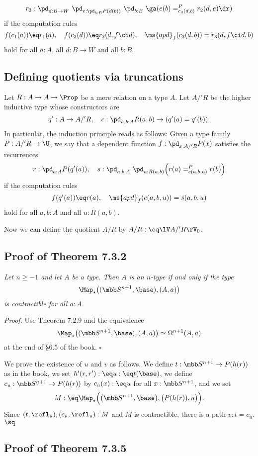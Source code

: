 \documentclass[12pt]{article}
\begin{document}
$$
r_3:\pd_{d:B\to W}\ \pd_{e:\pd_{b:B}P(d(b))}\ \pd_{b:B}\ \ga(e(b)=^P_{c_3(d,b)}r_2(d,e)\dr)
$$ 
if the computation rules
$$
f(c_1(a))\eq r_1(a),\quad f(c_2(d))\eq r_2(d,f\ci d),\quad\ms{apd}_f(c_3(d,b))=r_3(d,f\ci d,b)
$$ 
hold for all $a:A$, all $d:B\to W$ and all $b:B$. 


\subsection{Defining quotients via truncations}\label{qvt}

Let $R:A\to A\to\Prop$ be a mere relation on a type $A$. Let $A/'R$ be the higher inductive type whose constructors are 
$$
q':A\to A/'R,\quad c:\pd_{a,b:A}R(a,b)\to(q'(a)=q'(b)).
$$ 
In particular, the induction principle reads as follows: Given a type family $P:A/'R\to\U$, we say that a dependent function $f:\pd_{x:A/'R}P(x)$ satisfies the recurrences 
$$
r:\pd_{a:A}P(q'(a)),\quad s:\pd_{a,b:A}\ \pd_{u:R(a,b)}\Big(r(a)=^P_{c(a,b,u)}r(b)\Big)
$$ 
if the computation rules 
$$
f(q'(a))\eq r(a),\quad\ms{apd}_f(c(a,b,u))=s(a,b,u)
$$ 
hold for all $a,b:A$ and all $u:R(a,b)$. 

Now we can define the quotient $A/R$ by $A/R:\eq\lV A/'R\rV_0$. 


\subsection{Proof of Theorem 7.3.2}

 \emph{Let $n\ge-1$ and let $A$ be a type. Then $A$ is an $n$-type if and only if the type 
$$
\Map_\star\big((\mbb S^{n+1},\base),(A,a)\big)
$$ 
is contractible for all $a:A$.}

\nn\emph{Proof.} Use Theorem 7.2.9 and the equivalence 
$$
\Map_\star\big((\mbb S^{n+1},\base),(A,a)\big)\simeq\Omega^{n+1}(A,a)
$$ 
at the end of \S6.5 of the book. $\square$

We prove the existence of $u$ and $v$ as follows. We define $t:\mbb S^{n+1}\to P(h(r))$ as in the book, we set $h'(r,r'):\eq u:\eq t(\base)$, we define $c_u:\mbb S^{n+1}\to P(h(r))$ by $c_u(x):\eq u$ for all $x:\mbb S^{n+1}$, and we set
$$
M:\eq\Map_\star\Big(\big(\mbb S^{n+1},\base\big),\big(P(h(r)),u\big)\Big).
$$ 
Since $(t,\refl_u),(c_u,\refl_u):M$ and $M$ is contractible, there is a path $v:t=c_u$. $\sq$


\subsection{Proof of Theorem 7.3.5}
\end{document}
